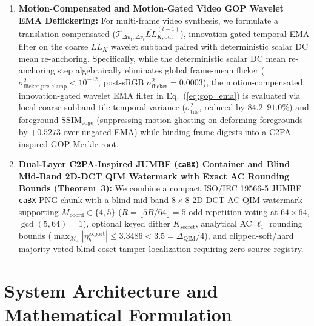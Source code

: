 \documentclass[conference,10pt]{IEEEtran}
\begin{document}
\begin{enumerate}
    \item \textbf{Motion-Compensated and Motion-Gated Video GOP Wavelet EMA Deflickering:} For multi-frame video synthesis, we formulate a translation-compensated ($\mathcal{T}_{\Delta u_t, \Delta v_t}\overline{LL}_{K,\text{out}}^{(t-1)}$), innovation-gated temporal EMA filter on the coarse $LL_K$ wavelet subband paired with deterministic scalar DC mean re-anchoring. Specifically, while the deterministic scalar DC mean re-anchoring step algebraically eliminates global frame-mean flicker ($\sigma^2_{\text{flicker,pre-clamp}} < 10^{-12}$, post-sRGB $\sigma^2_{\text{flicker}} = 0.0003$), the motion-compensated, innovation-gated wavelet EMA filter in Eq.~(\ref{eq:gop_ema}) is evaluated via local coarse-subband tile temporal variance ($\sigma^2_{\text{tile}}$, reduced by $84.2\text{--}91.0\%$) and foreground $\mathrm{SSIM}_{\text{edge}}$ (suppressing motion ghosting on deforming foregrounds by $+0.5273$ over ungated EMA) while binding frame digests into a C2PA-inspired GOP Merkle root.
    \item \textbf{Dual-Layer C2PA-Inspired JUMBF (\texttt{caBX}) Container and Blind Mid-Band 2D-DCT QIM Watermark with Exact AC Rounding Bounds (Theorem~3):} We combine a compact ISO/IEC 19566-5 JUMBF \texttt{caBX} PNG chunk with a blind mid-band $8\times 8$ 2D-DCT AC QIM watermark supporting $M_{\text{coord}} \in \{4, 5\}$ ($R=\lfloor 5B/64\rfloor = 5$ odd repetition voting at $64\times 64$, $\gcd(5,64)=1$), optional keyed dither $K_{\text{secret}}$, analytical AC $\ell_1$ rounding bounds ($\max_{\mathcal{M}_4}|\eta^{\text{export}}_b| \le 3.3486 < 3.5 = \Delta_{\text{QIM}}/4$), and clipped-soft/hard majority-voted blind coset tamper localization requiring zero source registry.
\end{enumerate}

\section{System Architecture and Mathematical Formulation}
\label{sec:architecture}
\end{document}
